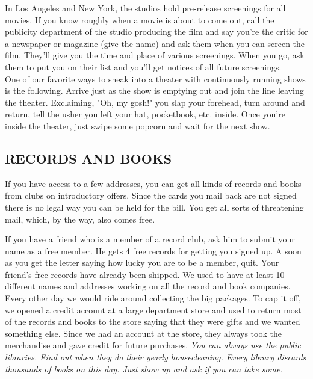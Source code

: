 \documentclass[11pt,twoside,a4paper]{book}
\begin{document}
In Los Angeles and New York, the studios hold pre-release screenings for all movies. If you know roughly when a movie is about to come out, call the publicity department of the studio producing the film and say you're the critic for a newspaper or magazine (give the name) and ask them when you can screen the film. They'll give you the time and place of various screenings. When you go, ask them to put you on their list and you'll get notices of all future screenings.~\\

One of our favorite ways to sneak into a theater with continuously running shows is the following. Arrive just as the show is emptying out and join the line leaving the theater. Exclaiming, "Oh, my gosh!" you slap your forehead, turn around and return, tell the usher you left your hat, pocketbook, etc. inside. Once you're inside the theater, just swipe some popcorn and wait for the next show. 

\subsection{RECORDS AND BOOKS}

If you have access to a few addresses, you can get all kinds of records and books from clubs on introductory offers. Since the cards you mail back are not signed there is no legal way you can be held for the bill. You get all sorts of threatening mail, which, by the way, also comes free.~\\

\clearpage

If you have a friend who is a member of a record club, ask him to submit your name as a free member. He gets 4 free records for getting you signed up. A soon as you get the letter saying how lucky you are to be a member, quit. Your friend's free records have already been shipped. We used to have at least 10 different names and addresses working on all the record and book companies. Every other day we would ride around collecting the big packages. To cap it off, we opened a credit account at a large department store and used to return most of the records and books to the store saying that they were gifts and we wanted something else. Since we had an account at the store, they always took the merchandise and gave credit for future purchases. \emph{You can always use the public libraries. Find out when they do their yearly housecleaning. Every library discards thousands of books on this day. Just show up and ask if you can take some. }~\\
\end{document}
